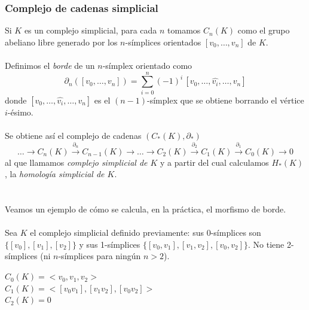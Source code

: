 \documentclass[12pt,a4paper]{article}
\begin{document}
\subsubsection{Complejo de cadenas simplicial}
Si $K$ es un complejo simplicial, para cada $n$ tomamos $C_n(K)$ como el grupo abeliano libre generado por los $n$-símplices orientados $[v_0, \ldots, v_n]$ de $K$.
\\
\\
Definimos el \textit{borde} de un $n$-símplex orientado como
\[
\partial_n([v_0, \ldots, v_n]) = \sum_{i=0}^{n}(-1)^i \, [v_0, \ldots, \hat{v_i}, \ldots, v_n]
\]
donde $[v_0, \ldots, \hat{v_i}, \ldots, v_n]$ es el $(n-1)$-símplex que se obtiene borrando el vértice $i$-ésimo.
\\
\\
Se obtiene así el complejo de cadenas $(C_*(K), \partial_*)$
\[
\ldots \rightarrow C_n(K) \xrightarrow{\partial_n} C_{n-1}(K) \rightarrow \ldots \rightarrow C_2(K) \xrightarrow{\partial_2} C_1(K) \xrightarrow{\partial_1} C_0(K) \rightarrow 0
\]
al que llamamos \textit{complejo simplicial de $K$} y a partir del cual calculamos $H_*(K)$, la \textit{homología simplicial de $K$}.
\\
\\
\\
Veamos un ejemplo de cómo se calcula, en la práctica, el morfismo de borde.
\\
\\
Sea $K$ el complejo simplicial definido previamente: sus 0-símplices son $\{[v_0], [v_1], [v_2]\}$ y sus 1-símplices $\{[v_0, v_1], [v_1,v_2], [v_0,v_2]\}$. No tiene 2-símplices (ni $n$-símplices para ningún $n>2$).
\begin{center}
\begin{minipage}{0.3\linewidth}
\centering
{}
\end{minipage}%
\begin{minipage}{0.5\linewidth}
\centering
$C_0(K) = <v_0, v_1, v_2>$
\\
$C_1(K) = <[v_0 v_1], [v_1v_2], [v_0v_2]>$
\\
$C_2(K) = 0$
\end{minipage}
\end{center}
\end{document}
